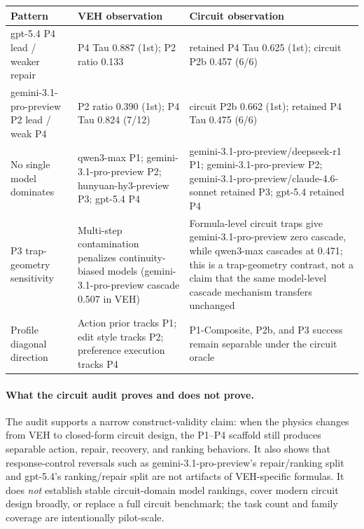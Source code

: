 \begin{center}
\label{tab:appendix_cross_domain_patterns}
\scriptsize
\setlength{\tabcolsep}{3pt}
\renewcommand{\arraystretch}{1.08}
\begin{tabularx}{\textwidth}{p{31mm}YY}
\toprule
Pattern & VEH observation & Circuit observation \\
\midrule
gpt-5.4 P4 lead / weaker repair & P4 Tau 0.887 (1st); P2 ratio 0.133 & retained P4 Tau 0.625 (1st); circuit P2b 0.457 (6/6) \\
gemini-3.1-pro-preview P2 lead / weak P4 & P2 ratio 0.390 (1st); P4 Tau 0.824 (7/12) & circuit P2b 0.662 (1st); retained P4 Tau 0.475 (6/6) \\
No single model dominates & qwen3-max P1; gemini-3.1-pro-preview P2; hunyuan-hy3-preview P3; gpt-5.4 P4 & gemini-3.1-pro-preview/deepseek-r1 P1; gemini-3.1-pro-preview P2; gemini-3.1-pro-preview/claude-4.6-sonnet retained P3; gpt-5.4 retained P4 \\
P3 trap-geometry sensitivity & Multi-step contamination penalizes continuity-biased models (gemini-3.1-pro-preview cascade 0.507 in VEH) & Formula-level circuit traps give gemini-3.1-pro-preview zero cascade, while qwen3-max cascades at 0.471; this is a trap-geometry contrast, not a claim that the same model-level cascade mechanism transfers unchanged \\
Profile diagonal direction & Action prior tracks P1; edit style tracks P2; preference execution tracks P4 & P1-Composite, P2b, and P3 success remain separable under the circuit oracle \\
\bottomrule
\end{tabularx}
\end{center}

\paragraph{What the circuit audit proves and does not prove.}
The audit supports a narrow construct-validity claim: when the physics changes from VEH to closed-form circuit design, the P1--P4 scaffold still produces separable action, repair, recovery, and ranking behaviors. It also shows that response-control reversals such as gemini-3.1-pro-preview's repair/ranking split and gpt-5.4's ranking/repair split are not artifacts of VEH-specific formulas. It does \emph{not} establish stable circuit-domain model rankings, cover modern circuit design broadly, or replace a full circuit benchmark; the task count and family coverage are intentionally pilot-scale.
